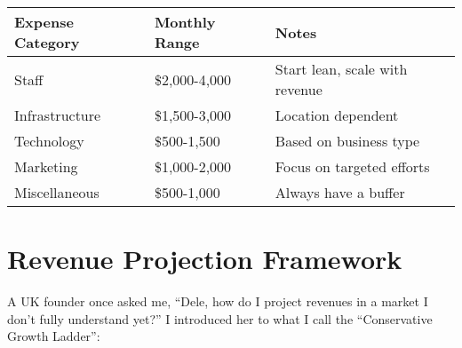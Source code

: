 \begin{center}
\begin{tabularx}{\textwidth}{>{\raggedright\arraybackslash}X >{\centering\arraybackslash}X >{\raggedright\arraybackslash}X}
    \toprule
    \textbf{Expense Category} & \textbf{Monthly Range} & \textbf{Notes} \\
    \midrule
    Staff & \$2,000-4,000 & Start lean, scale with revenue \\
    Infrastructure & \$1,500-3,000 & Location dependent \\
    Technology & \$500-1,500 & Based on business type \\
    Marketing & \$1,000-2,000 & Focus on targeted efforts \\
    Miscellaneous & \$500-1,000 & Always have a buffer \\
    \bottomrule
\end{tabularx}
\end{center}

\section{Revenue Projection Framework}\label{sec:revenue-projection}

A UK founder once asked me, ``Dele, how do I project revenues in a market I don't fully understand yet?'' I introduced her to what I call the ``Conservative Growth Ladder'':

